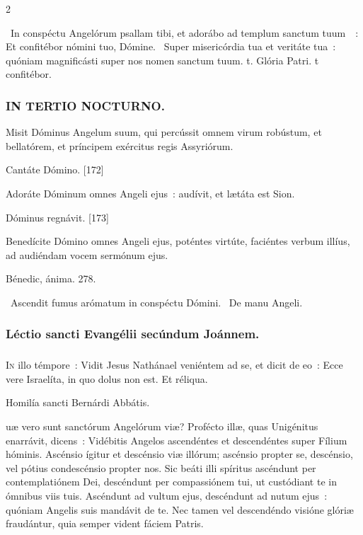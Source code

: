 \documentclass[9pt,twoside]{extarticle}
\begin{document}
\begin{multicols}{2}
{{\begin{tightlist}{}
\item {}~In conspéctu Angelórum psallam tibi, et adorábo ad templum sanctum tuum~~: \textred{*} Et confitébor nómini tuo, Dómine. ~Super misericórdia tua et veritáte tua~: quóniam magnificásti super nos nomen sanctum tuum. t. Glória Patri. t confitébor.
\end{tightlist}

\subsubsection*{\center \textsc{IN TERTIO NOCTURNO.}}
\begin{tightlist}{}
\item {} Misit Dóminus Angelum suum, qui percússit omnem virum robústum, et bellatórem, et príncipem exércitus regis Assyriórum.
\item {} Cantáte Dómino. [172]
\item {} Adoráte Dóminum omnes Angeli ejus~: audívit, et lætáta est Sion.
\item {} Dóminus regnávit. [173]
\item {} Benedícite Dómino omnes Angeli ejus, poténtes virtúte, faciéntes verbum illíus, ad audiéndam vocem sermónum ejus.
\item {} Bénedic, ánima. 278.
\item {}~Ascendit fumus arómatum in conspéctu Dómini. ~De manu Angeli.
\end{tightlist}

\subsubsection*{\center Léctio sancti Evangélii secúndum Joánnem.}
\subsubsection*{\center {}}
\lettrine{I}n illo témpore~: Vidit Jesus Nathánael veniéntem ad se, et dicit de eo~: Ecce vere Israelíta, in quo dolus non est. Et réliqua.

\begin{center}Homilía sancti Bernárdi Abbátis.\\
\end{center}
uæ vero sunt sanctórum Angelórum viæ? Profécto illæ, quas Unigénitus enarrávit, dicens~: Vidébitis Angelos ascendéntes et descendéntes super Fílium hóminis. Ascénsio ígitur et descénsio viæ illórum; ascénsio propter se, descénsio, vel pótius condescénsio propter nos. Sic beáti illi spíritus ascéndunt per contemplatiónem Dei, descéndunt per compassiónem tui, ut custódiant te in ómnibus viis tuis. Ascéndunt ad vultum ejus, descéndunt ad nutum ejus~: quóniam Angelis suis mandávit de te. Nec tamen vel descendéndo visióne glóriæ fraudántur, quia semper vident fáciem Patris.

}}
\end{multicols}
\end{document}
